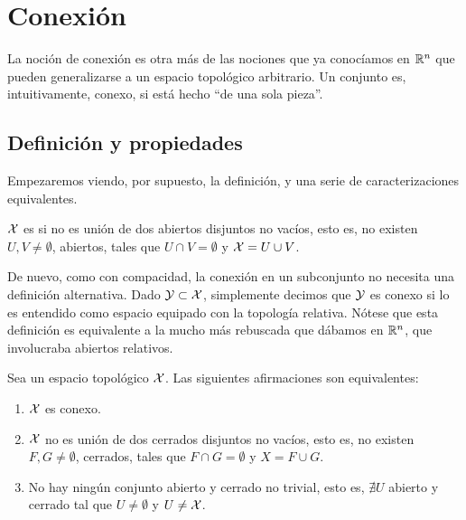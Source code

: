 \chapter{Conexión}
\label{conex}

La noción de conexión es otra más de las nociones que ya conocíamos en $\mathbb{R}^n$ que pueden generalizarse a un espacio topológico arbitrario. Un conjunto es, intuitivamente, conexo, si está hecho ``de una sola pieza''. 

\section{Definición y propiedades}

Empezaremos viendo, por supuesto, la definición, y una serie de caracterizaciones equivalentes.

\begin{defi}[Conexión]
	$\mathcal{X}$ es  si no es unión de dos abiertos disjuntos no vacíos, esto es, no existen $U,V\neq\emptyset$, abiertos, tales que $U\cap V=\emptyset$ y $\mathcal{X}=U\cup V$.
\end{defi}

\begin{obs}
	De nuevo, como con compacidad, la conexión en un subconjunto no necesita una definición alternativa. Dado $\mathcal{Y}\subset\mathcal{X}$, simplemente decimos que $\mathcal{Y}$ es conexo si lo es entendido como espacio equipado con la topología relativa. Nótese que esta definición es equivalente a la mucho más rebuscada que dábamos en $\mathbb{R}^n$, que involucraba abiertos relativos.
\end{obs}

\begin{prop}
	Sea un espacio topológico $\mathcal{X}$. Las siguientes afirmaciones son equivalentes:
	\begin{enumerate}
		\item $\mathcal{X}$ es conexo.
		\item $\mathcal{X}$ no es unión de dos cerrados disjuntos no vacíos, esto es, no existen $F,G\neq\emptyset$, cerrados, tales que $F\cap G=\emptyset$ y $X=F\cup G$.
		\item No hay ningún conjunto abierto y cerrado no trivial, esto es, $\nexists U$ abierto y cerrado tal que $U\neq\emptyset$ y $U\neq\mathcal{X}$.
	\end{enumerate}
\end{prop}

